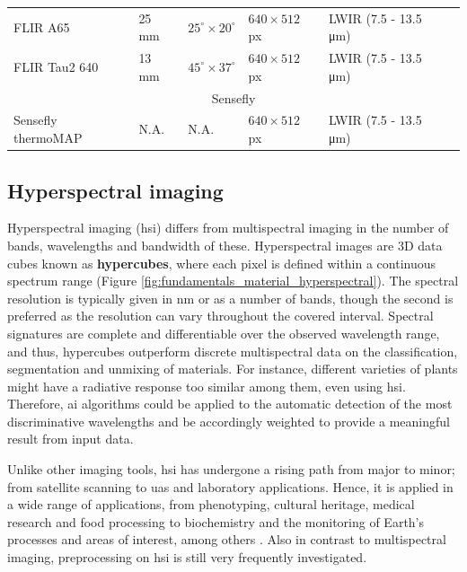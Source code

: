 \begin{table}[htb]
\begin{tabular}{llllll}
        FLIR A65     & 25 \si{\milli\meter}   & $25^{\circ} \times 20^{\circ}$  & $640 \times 512$ px  & LWIR (7.5 - 13.5 \si{\micro\meter})    & \cite{adan_fusion_2017, jarzabek-rychard_supervised_2020, lin_fusion_2019, westfeld_generation_2015}\\
        FLIR Tau2 640     & 13 \si{\milli\meter}   & $45^{\circ} \times 37^{\circ}$  & $640 \times 512$ px  & LWIR (7.5 - 13.5 \si{\micro\meter})    & \cite{boesch_thermal_2017, sledz_thermal_2018}\\
        \cmidrule{1-6}
        \multicolumn{6}{c}{Sensefly}\\
        Sensefly thermoMAP     & N.A.   & N.A.  & $640 \times 512$ px  & LWIR (7.5 - 13.5 \si{\micro\meter})    & \cite{padua_vineyard_2019}\\
        \bottomrule
    \end{tabular}
\end{table}
\renewcommand{\arraystretch}{1}

\subsection{Hyperspectral imaging}

Hyperspectral imaging (\acrshort{hsi}) differs from multispectral imaging in the number of bands, wavelengths and bandwidth of these. Hyperspectral images are 3D data cubes known as \textbf{hypercubes}, where each pixel is defined within a continuous spectrum range (Figure \ref{fig:fundamentals_material_hyperspectral}). The spectral resolution is typically given in \si{\nano\meter} or as a number of bands, though the second is preferred as the resolution can vary throughout the covered interval. Spectral signatures are complete and differentiable over the observed wavelength range, and thus, hypercubes outperform discrete multispectral data on the classification, segmentation and unmixing of materials. For instance, different varieties of plants might have a radiative response too similar among them, even using \acrshort{hsi}. Therefore, \acrshort{ai} algorithms could be applied to the automatic detection of the most discriminative wavelengths and be accordingly weighted to provide a meaningful result from input data. 

Unlike other imaging tools, \acrshort{hsi} has undergone a rising path from major to minor; from satellite scanning to \acrshort{uas} and laboratory applications. Hence, it is applied in a wide range of applications, from phenotyping, cultural heritage, medical research and food processing to biochemistry and the monitoring of Earth's processes and areas of interest, among others \cite{amigo_hyperspectral_2019}. Also in contrast to multispectral imaging, preprocessing on \acrshort{hsi} is still very frequently investigated. 

